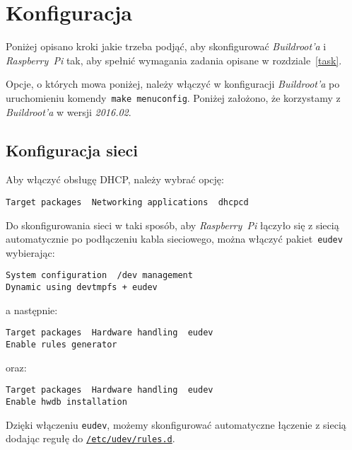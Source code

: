 \documentclass{article}
\begin{document}
\section{Konfiguracja}

Poniżej opisano kroki jakie trzeba podjąć, aby skonfigurować \emph{Buildroot'a} i \emph{Raspberry~Pi} tak, aby spełnić wymagania zadania opisane w rozdziale~\ref{task}.

Opcje, o których mowa poniżej, należy włączyć w konfiguracji \emph{Buildroot'a} po uruchomieniu komendy~\texttt{make menuconfig}. Poniżej założono, że korzystamy z \emph{Buildroot'a} w wersji \emph{2016.02}.


\subsection{Konfiguracja sieci}

Aby włączyć obsługę DHCP, należy wybrać opcję:
\begin{center}
\texttt{Target packages \textrightarrow\ Networking applications \textrightarrow\ dhcpcd}
\end{center}

\noindent Do skonfigurowania sieci w taki sposób, aby \emph{Raspberry~Pi} łączyło się z siecią automatycznie po podłączeniu kabla sieciowego, można włączyć pakiet~\texttt{eudev} wybierając:
\begin{center}
\texttt{System configuration \textrightarrow\ /dev management\ \textrightarrow\\Dynamic using devtmpfs + eudev}
\end{center}
a następnie:
\begin{center}
\texttt{Target packages \textrightarrow\ Hardware handling \textrightarrow\ eudev \textrightarrow\\Enable rules generator}
\end{center}
oraz:
\begin{center}
\texttt{Target packages \textrightarrow\ Hardware handling \textrightarrow\ eudev \textrightarrow\\Enable hwdb installation}
\end{center}

\noindent Dzięki włączeniu \texttt{eudev}, możemy skonfigurować automatyczne łączenie z siecią dodając regułę do \href{https://github.com/maximeh/buildroot/blob/master/support/scripts/mkusers}{\texttt{/etc/udev/rules.d}}.
\end{document}
